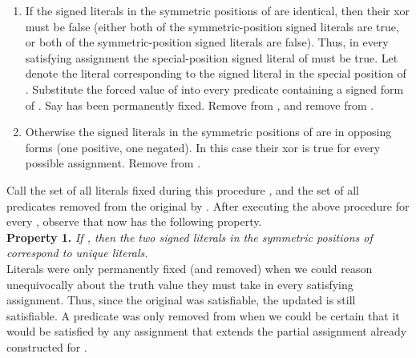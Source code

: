 \documentclass{article}
\begin{document}
\begin{enumerate}
\item If the signed literals in the symmetric positions of  are identical, then their xor must be false (either both of the symmetric-position signed literals are true, or both of the symmetric-position signed literals are false). Thus, in every satisfying assignment the special-position signed literal of  must be true. 
Let  denote the literal corresponding to the signed literal in the special position of . Substitute the forced value of  into every predicate containing a signed form of . Say  has been permanently fixed. Remove  from , and remove  from . 

\item Otherwise the signed literals in the symmetric positions of  are in opposing forms (one positive, one negated). In this case their xor is true for every possible assignment. Remove  from .
\end{enumerate}
    
   Call the set of all literals fixed during this procedure , and the set of all predicates removed from the original  by .
After executing the above procedure for every , observe that  now has the following property.  \\

\noindent \textbf{Property 1.} \textit{If , then the two signed literals in the symmetric positions of  correspond to unique literals.}\\

Literals were only permanently fixed (and removed) when we could reason unequivocally about the truth value they must take in every satisfying assignment. Thus, since the original  was satisfiable, the updated  is still satisfiable. A predicate was only removed from  when we could be certain that it would be satisfied by any assignment that extends the partial assignment already constructed for .
    
\end{document}
